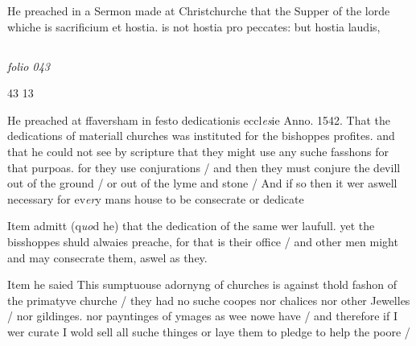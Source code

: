 \documentclass[12pt, a4paper]{book}
\begin{document}
		\ifthenelse{\isodd{\thepage}}
		{\reversemarginpar}
		{\normalmarginpar}
		He preached in a Sermon made at Christchurche
 that the Supper of the lorde whiche is
 sacrificium et hostia. is not hostia pro peccates: but
 hostia laudis,



\dotfill
						\newpage {} \subsection*{}

\textit{folio 043}


\begin{flushright}{\color{Mahogany}43} 13\end{flushright}
	
		
				\marginpar[\vspace{0.5cm}{\textcolor{Gray}{seditious}}]{}
			
		
		\ifthenelse{\isodd{\thepage}}
		{\reversemarginpar}
		{\normalmarginpar}
		 He preached at ffaversham in festo dedicationis eccl\textit{es}ie
			Anno. 1542. That the dedications of materiall
			churches was instituted for the bishoppes profites. and
			that he could not see by scripture that they might
			use any suche fasshons for that purpoas. for they
			use conjurations / and then they must conjure the
			devill out of the ground / or out of the lyme
			and stone / And if so then it wer aswell necessary
			for ev\textit{er}y mans house to be consecrate or dedicate
	
		
				\marginpar[\vspace{0.5cm}{\textcolor{Gray}{seditious}}]{}
			
		
		\ifthenelse{\isodd{\thepage}}
		{\reversemarginpar}
		{\normalmarginpar}
		 Item admitt (q\textit{uo}d he) that the dedication of the same
			wer laufull. yet the bisshoppes shuld alwaies
			preache, for that is their office / and other men
			might and may consecrate them, aswel as they.
	
	
		
				\marginpar[\vspace{0.5cm}{\textcolor{Gray}{seditious}}]{}
			
		
		\ifthenelse{\isodd{\thepage}}
		{\reversemarginpar}
		{\normalmarginpar}
		 Item he saied This sumptuouse adornyng of
			churches is against thold fashon of the primatyve
			churche / they had no suche coopes nor chalices
			nor other Jewelles / nor gildinges. nor payntinges
			of ymages as wee nowe have / and therefore if
			I wer curate I wold sell all suche thinges
			or laye them to pledge to help the poore /
	
\end{document}
